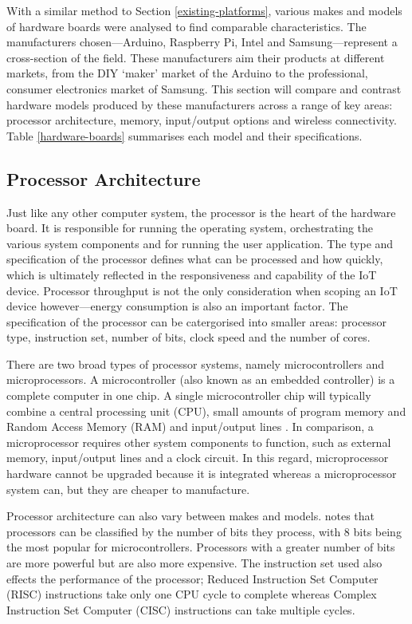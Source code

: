       With a similar method to Section \ref{existing-platforms}, various makes and models of hardware boards were analysed to find comparable characteristics. The manufacturers chosen---Arduino, Raspberry Pi, Intel and Samsung---represent a cross-section of the field. These manufacturers aim their products at different markets, from the DIY `maker' market of the Arduino to the professional, consumer electronics market of Samsung. This section will compare and contrast hardware models produced by these manufacturers across a range of key areas: processor architecture, memory, input/output options and wireless connectivity. Table \ref{hardware-boards} summarises each model and their specifications.

    \subsection{Processor Architecture}
      Just like any other computer system, the processor is the heart of the hardware board. It is responsible for running the operating system, orchestrating the various system components and for running the user application. The type and specification of the processor defines what can be processed and how quickly, which is ultimately reflected in the responsiveness and capability of the IoT device. Processor throughput is not the only consideration when scoping an IoT device however---energy consumption is also an important factor. The specification of the processor can be catergorised into smaller areas: processor type, instruction set, number of bits, clock speed and the number of cores.

      There are two broad types of processor systems, namely microcontrollers and microprocessors. A microcontroller (also known as an embedded controller) is a complete computer in one chip. A single microcontroller chip will typically combine a central processing unit (CPU), small amounts of program memory and Random Access Memory (RAM) and input/output lines \citep{microcontrollers:2011}. In comparison, a microprocessor requires other system components to function, such as external memory, input/output lines and a clock circuit. In this regard, microprocessor hardware cannot be upgraded because it is integrated whereas a microprocessor system can, but they are cheaper to manufacture.

      Processor architecture can also vary between makes and models. \citeauthor{microcontrollers:2011} notes that processors can be classified by the number of bits they process, with 8 bits being the most popular for microcontrollers. Processors with a greater number of bits are more powerful but are also more expensive. The instruction set used also effects the performance of the processor; Reduced Instruction Set Computer (RISC) instructions take only one CPU cycle to complete whereas Complex Instruction Set Computer (CISC) instructions can take multiple cycles.


